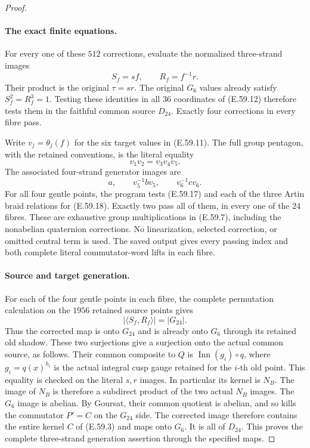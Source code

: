 \begin{proof}
\paragraph{The exact finite equations.}
For every one of these $512$ corrections, evaluate the normalized
three-strand images
\[
                      S_f=sf,\qquad R_f=f^{-1}r.
 \tag{E.59.16}
\]
Their product is the original $\tau=sr$. The original $G_6$ values
already satisfy $S_f^2=R_f^3=1$. Testing these identities in all
$36$ coordinates of \textup{(E.59.12)} therefore tests them in
the faithful common source $D_{24}$. Exactly four corrections
in every fibre pass.

Write $v_j=\theta_j(f)$ for the six target values in
\textup{(E.59.11)}. The full group pentagon, with the retained
conventions, is the literal equality
\[
                  v_1v_2=v_3v_4v_5.
 \tag{E.59.17}
\]
The associated four-strand generator images are
\[
                  a,\qquad v_5^{-1}bv_5,\qquad v_6^{-1}cv_6.
 \tag{E.59.18}
\]
For all four gentle points, the program tests
\textup{(E.59.17)} and each of the three Artin braid relations
for \textup{(E.59.18)}. Exactly two pass all of them, in every
one of the $24$ fibres. These are exhaustive group multiplications
in \textup{(E.59.7)}, including the nonabelian quaternion
corrections. No linearization, selected correction, or omitted
central term is used. The saved output gives every passing index
and both complete literal commutator-word lifts in each fibre.

\paragraph{Source and target generation.}
For each of the four gentle points in each fibre, the complete
permutation calculation on the $1956$ retained source points gives
\[
                  |\langle S_f,R_f\rangle|=|G_{24}|.
 \tag{E.59.19}
\]
Thus the corrected map is onto $G_{24}$ and is already onto $G_6$
through its retained old shadow. These two surjections give a
surjection onto the actual common source, as follows. Their
common composite to $Q$ is $\operatorname{Inn}(g_i)\circ q$,
where $g_i=q(x)^{h_i}$ is the actual integral cusp gauge retained
for the $i$-th old point. This equality is checked on the literal
$s,r$ images. In particular its kernel is $N_B$. The image of
$N_B$ is therefore a subdirect product of the
two actual $N_B$ images. The $G_6$ image is abelian. By Goursat,
their common quotient is abelian, and so kills the commutator
$P'=C$ on the $G_{24}$ side. The corrected image therefore
contains the entire kernel $C$ of \textup{(E.59.3)} and maps onto
$G_6$. It is all of $D_{24}$. This proves the complete
three-strand generation assertion through the specified maps.


\end{proof}
